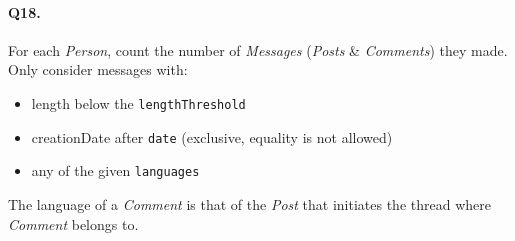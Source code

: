 \paragraph{Q18.}
For each \emph{Person}, count the number of \emph{Messages}
(\emph{Posts} \& \emph{Comments}) they made.
Only consider messages with:
\begin{itemize}
\tightlist
\item
  length below the \texttt{lengthThreshold}
\item
  creationDate after \texttt{date} (exclusive, equality is not allowed)
\item
  any of the given \texttt{languages}
\end{itemize}
The language of a \emph{Comment} is that of the \emph{Post} that
initiates the thread where \emph{Comment} belongs to.

